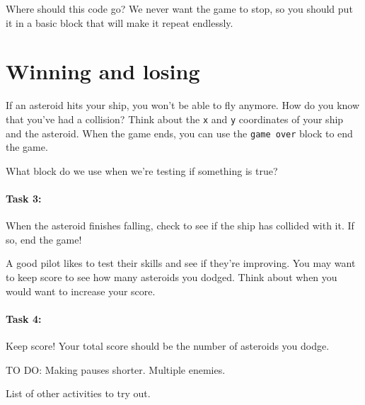 \documentclass{article}
\begin{document}
\begin{multicols*}{2}
Where should this code go? We never want the game to stop, so you should put it in a basic block that will make it repeat endlessly.

\section{Winning and losing}
If an asteroid hits your ship, you won't be able to fly anymore. How do you know that you've had a collision? Think about the \texttt{x} and \texttt{y} coordinates of your ship and the asteroid. When the game ends, you can use the \texttt{game over} block to end the game.

What block do we use when we're testing if something is true? 

\paragraph{Task 3:} When the asteroid finishes falling, check to see if the ship has collided with it. If so, end the game!

A good pilot likes to test their skills and see if they're improving. You may want to keep score to see how many asteroids you dodged. Think about when you would want to increase your score.

\paragraph{Task 4:} Keep score! Your total score should be the number of asteroids you dodge.

TO DO: Making pauses shorter. Multiple enemies.

List of other activities to try out.


\end{multicols*}
\end{document}
